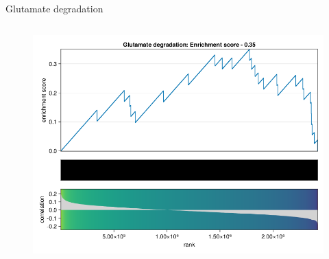 \begin{frame}{Glutamate degradation}
    \begin{columns}[c] %

        \begin{figure}
            \includegraphics[width=1\linewidth]{../figures/fsea_Glutamate-degradation.png}
        \end{figure}

    \end{columns}

\end{frame}

